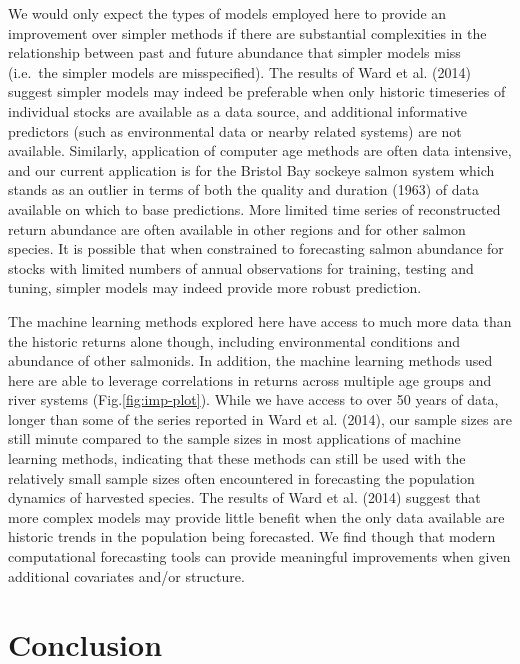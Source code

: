 \documentclass[
]{article}
\begin{document}
We would only expect the types of models employed here to provide an improvement over simpler methods if there are substantial complexities in the relationship between past and future abundance that simpler models miss (i.e.~the simpler models are misspecified). The results of Ward et al. (2014) suggest simpler models may indeed be preferable when only historic timeseries of individual stocks are available as a data source, and additional informative predictors (such as environmental data or nearby related systems) are not available. Similarly, application of computer age methods are often data intensive, and our current application is for the Bristol Bay sockeye salmon system which stands as an outlier in terms of both the quality and duration (1963) of data available on which to base predictions. More limited time series of reconstructed return abundance are often available in other regions and for other salmon species. It is possible that when constrained to forecasting salmon abundance for stocks with limited numbers of annual observations for training, testing and tuning, simpler models may indeed provide more robust prediction.

The machine learning methods explored here have access to much more data than the historic returns alone though, including environmental conditions and abundance of other salmonids. In addition, the machine learning methods used here are able to leverage correlations in returns across multiple age groups and river systems (Fig.\ref{fig:imp-plot}). While we have access to over 50 years of data, longer than some of the series reported in Ward et al. (2014), our sample sizes are still minute compared to the sample sizes in most applications of machine learning methods, indicating that these methods can still be used with the relatively small sample sizes often encountered in forecasting the population dynamics of harvested species. The results of Ward et al. (2014) suggest that more complex models may provide little benefit when the only data available are historic trends in the population being forecasted. We find though that modern computational forecasting tools can provide meaningful improvements when given additional covariates and/or structure.

\hypertarget{conclusion}{%
\section*{Conclusion}\label{conclusion}}
\end{document}
